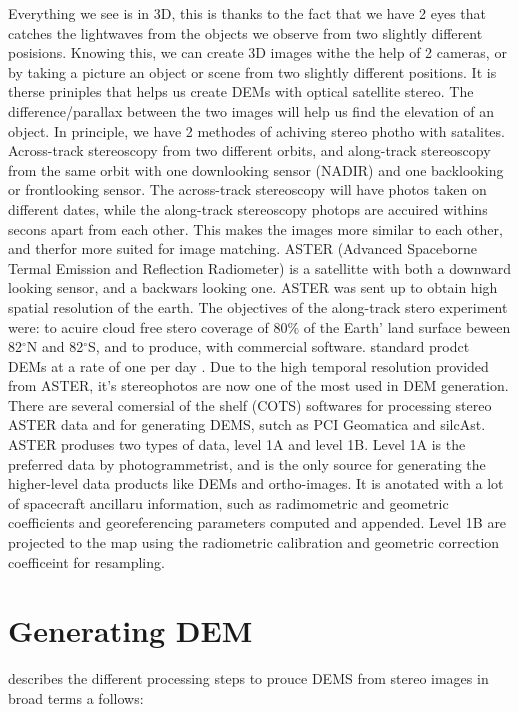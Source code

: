 \documentclass[a4paper,UKenglish]{article}
\begin{document}
Everything we see is in 3D, this is thanks to the fact that we have 2 eyes that catches the lightwaves from the objects we observe from two slightly different posisions. Knowing this, we can create 3D images withe the help of 2 cameras, or by taking a picture an object or scene from two slightly different positions. It is therse priniples that helps us create DEMs with optical satellite stereo. The difference/parallax between the two images will help us find the elevation of an object. In principle, we have 2 methodes of achiving stereo photho with satalites. Across-track stereoscopy from two different orbits, and along-track stereoscopy from the same orbit with one downlooking sensor (NADIR) and one backlooking or frontlooking sensor. The across-track stereoscopy will have photos taken on different dates, while the along-track stereoscopy photops are accuired withins secons apart from each other. This makes the images more similar to each other, and therfor more suited for image matching. ASTER (Advanced Spaceborne Termal Emission and Reflection Radiometer) is a satellitte with both a downward looking sensor, and a backwars looking one. ASTER was sent up to obtain high spatial resolution of the earth. The objectives of the along-track stero experiment were: to acuire cloud free stero coverage of 80$\%$ of the Earth' land surface beween 82$^{\circ}$N and 82$^{\circ}$S, and to produce, with commercial software. standard prodct DEMs at a rate of one per day \citep{toutin08}. Due to the high temporal resolution provided from ASTER, it's stereophotos are now one of the most used in DEM generation. There are several comersial of the shelf (COTS) softwares for processing stereo ASTER data and for generating DEMS, sutch as PCI Geomatica and silcAst. ASTER produses two types of data, level 1A and level 1B. Level 1A is the preferred data by photogrammetrist, and is the only source for generating the higher-level data products like DEMs and ortho-images. It is anotated with a lot of spacecraft ancillaru information, such as radimometric and geometric coefficients and georeferencing parameters computed and appended. Level 1B are projected to the map using the radiometric calibration and geometric correction coefficeint for resampling. 

\section{Generating DEM}

\cite{toutin01} describes the different processing steps to prouce DEMS from stereo images in broad terms a follows: 
\end{document}
